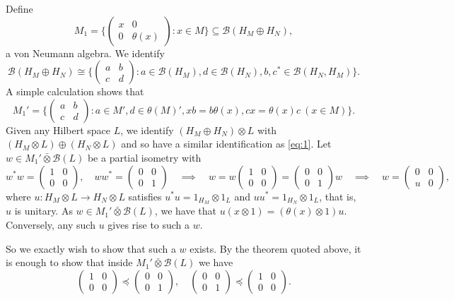 \documentclass[a4paper,11pt]{article}
\theoremstyle{plain}
\theoremstyle{remark}
\newcommand{\mc}[1]{\mathcal{#1}}
\newcommand{\vnten}{\bar\otimes}
\begin{document}
Define
\[ M_1 = \Big\{ \begin{pmatrix} x & 0 \\ 0 & \theta(x) \end{pmatrix}: x\in M \Big\} \subseteq \mc B(H_M \oplus H_N), \]
a von Neumann algebra.  We identify
\begin{equation} \label{eq:1}
\mc B(H_M \oplus H_N) \cong
\Big\{ \begin{pmatrix} a & b \\ c & d \end{pmatrix} : a\in\mc B(H_M), d\in\mc B(H_N), b,c^*\in\mc B(H_N, H_M) \Big\}.
\end{equation}
A simple calculation shows that
\[ M_1' = \Big\{ \begin{pmatrix} a & b \\ c & d \end{pmatrix} : a\in M', d\in\theta(M)', xb=b\theta(x), cx=\theta(x)c \ (x\in M) \Big\}. \]
Given any Hilbert space $L$, we identify $(H_M \oplus H_N) \otimes L$ with $(H_M\otimes L) \oplus (H_N\otimes L)$ and so have a similar identification as \eqref{eq:1}.  Let $w\in M_1'\vnten\mc B(L)$ be a partial isometry with
\[ w^*w = \begin{pmatrix} 1 & 0 \\ 0 & 0 \end{pmatrix}, \quad
ww^* = \begin{pmatrix} 0 & 0 \\ 0 & 1 \end{pmatrix}
\quad\implies\quad
w = w \begin{pmatrix} 1 & 0 \\ 0 & 0 \end{pmatrix} =
\begin{pmatrix} 0 & 0 \\ 0 & 1 \end{pmatrix} w
\quad\implies\quad
w = \begin{pmatrix} 0 & 0 \\ u & 0 \end{pmatrix}, \]
where $u \colon H_M\otimes L \to H_N\otimes L$ satisfies $u^*u = 1_{H_M}\otimes 1_L$ and $uu^* = 1_{H_N}\otimes 1_L$, that is, $u$ is unitary.  As $w\in M_1'\vnten\mc B(L)$, we have that $u(x\otimes 1) = (\theta(x)\otimes 1)u$.  Conversely, any such $u$ gives rise to such a $w$.

So we exactly wish to show that such a $w$ exists.  By the theorem quoted above, it is enough to show that inside $M_1'\vnten\mc B(L)$ we have
\[ \begin{pmatrix} 1 & 0 \\ 0 & 0 \end{pmatrix} \preceq \begin{pmatrix} 0 & 0 \\ 0 & 1 \end{pmatrix},
\quad
\begin{pmatrix} 0 & 0 \\ 0 & 1 \end{pmatrix} \preceq  
\begin{pmatrix} 1 & 0 \\ 0 & 0 \end{pmatrix}. \]
\end{document}
